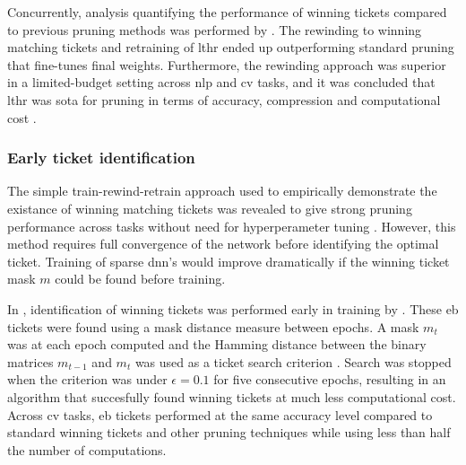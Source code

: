 \documentclass[12pt,fleqn,twocolumn]{article}
\begin{document}
Concurrently, analysis quantifying the performance of winning tickets compared to previous pruning methods was performed by \textcite{Renda2020ComparingRA}.
The rewinding to winning matching tickets and retraining of \acrshort{lthr} ended up outperforming standard pruning that fine-tunes final weights.
Furthermore, the rewinding approach was superior in a limited-budget setting across \acrfull{nlp} and \acrfull{cv} tasks, and it was concluded that \acrshort{lthr} was \acrfull{sota} for pruning in terms of accuracy, compression and computational cost \cite[Chap. 6]{Renda2020ComparingRA} \cite{lange2020lth}.

\subsubsection*{Early ticket identification}
The simple train-rewind-retrain approach used to empirically demonstrate the existance of winning matching tickets was revealed to give strong pruning performance across tasks without need for hyperperameter tuning \cite[Chap. 6]{Renda2020ComparingRA}.
However, this method requires full convergence of the network before identifying the optimal ticket.
Training of sparse \acrshort{dnn}'s would improve dramatically if the winning ticket mask $m$ could be found before training.

In \citeyear{You2020DrawingET}, identification of winning tickets was performed early in training by \textcite{You2020DrawingET}.
These \acrfull{eb} tickets were found using a mask distance measure between epochs.
A mask $m_t$ was at each epoch computed and the Hamming distance between the binary matrices $m_{t-1}$ and $m_{t}$ was used as a ticket search criterion \cite[Chap. 3.3]{You2020DrawingET}.
Search was stopped when the criterion was under $\epsilon = 0.1$ for five consecutive epochs, resulting in an algorithm that succesfully found winning tickets at much less computational cost.
Across \acrshort{cv} tasks, \acrshort{eb} tickets performed at the same accuracy level compared to standard winning tickets and other pruning techniques while using less than half the number of computations.
\end{document}
